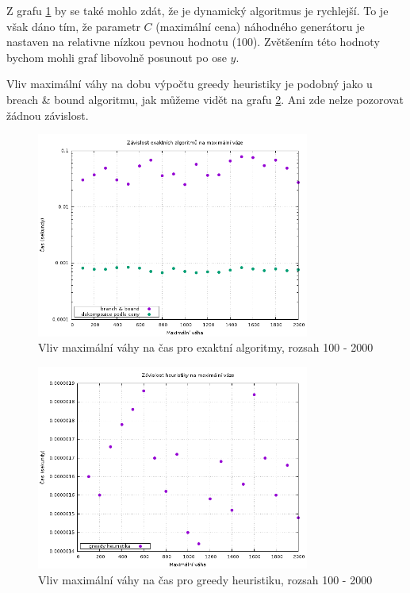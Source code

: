 \documentclass[11pt]{article}
\begin{document}
Z grafu \ref{fig:exact_times_weight} by se také mohlo zdát, že je dynamický algoritmus je rychlejší. To je však dáno tím, že parametr $C$ (maximální cena) náhodného generátoru je nastaven na relativne nízkou pevnou hodnotu (100). 
Zvětšením této hodnoty bychom mohli graf libovolně posunout po ose $y$.

Vliv maximální váhy na dobu výpočtu greedy heuristiky je podobný jako u breach \& bound algoritmu, jak můžeme vidět na grafu \ref{fig:greedy_weight}. Ani zde nelze pozorovat žádnou závislost.

\begin{figure}[h!]
	\centering
    	\includegraphics[width=0.8\textwidth]{../data/max_weight_times.png}
	\caption{Vliv maximální váhy na čas pro exaktní algoritmy, rozsah 100 - 2000}
	\label{fig:exact_times_weight}
\end{figure}

\begin{figure}[h!]
	\centering
    	\includegraphics[width=0.8\textwidth]{../data/greedy_weight.png}
	\caption{Vliv maximální váhy na čas pro greedy heuristiku, rozsah 100 - 2000}
	\label{fig:greedy_weight}
\end{figure}
\end{document}
